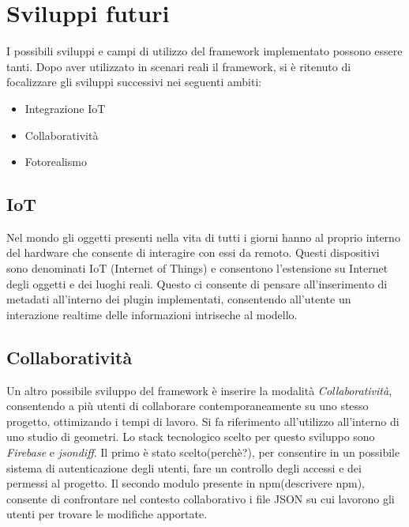 \section{Sviluppi futuri}
\label{sec:conclusions_section_2}

I possibili sviluppi e campi di utilizzo del framework implementato possono essere tanti.
Dopo aver utilizzato in scenari reali il framework, si è ritenuto di focalizzare gli sviluppi successivi nei seguenti ambiti:
\begin{itemize}
\item Integrazione IoT
\item Collaboratività
\item Fotorealismo
\end{itemize}
\newpage

\subsection{IoT}
\label{sec:conclusions_section_2_sub_1}
Nel mondo gli oggetti presenti nella vita di tutti i giorni hanno al proprio interno del hardware che consente di interagire
con essi da remoto. Questi dispositivi sono denominati IoT (Internet of Things) e consentono l'estensione su Internet degli
oggetti e dei luoghi reali. Questo ci consente di pensare all'inserimento di metadati all'interno dei plugin implementati,
consentendo all'utente un interazione realtime delle informazioni intriseche al modello.

\newpage

\subsection{Collaboratività}
\label{sec:conclusions_section_2_sub_2}
Un altro possibile sviluppo del framework è inserire la modalità \emph{Collaboratività}, consentendo a più utenti
di collaborare contemporaneamente su uno stesso progetto, ottimizando i tempi di lavoro. Si fa riferimento
all'utilizzo all'interno di uno studio di geometri. Lo stack tecnologico scelto per questo sviluppo sono
\emph{Firebase} e \emph{jsondiff}. Il primo è stato scelto(perchè?), per consentire in un possibile sistema di autenticazione degli utenti,
fare un controllo degli accessi e dei permessi al progetto.
Il secondo modulo presente in npm(descrivere npm), consente di confrontare nel contesto collaborativo i file JSON su cui lavorono
gli utenti per trovare le modifiche apportate.

